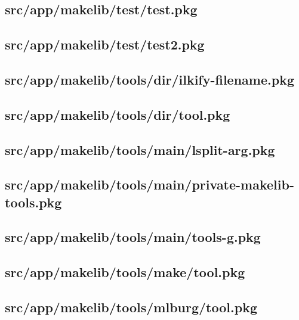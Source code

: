 \subsection{src/app/makelib/test/test.pkg}


\subsection{src/app/makelib/test/test2.pkg}


\subsection{src/app/makelib/tools/dir/ilkify-filename.pkg}


\subsection{src/app/makelib/tools/dir/tool.pkg}


\subsection{src/app/makelib/tools/main/lsplit-arg.pkg}


\subsection{src/app/makelib/tools/main/private-makelib-tools.pkg}


\subsection{src/app/makelib/tools/main/tools-g.pkg}


\subsection{src/app/makelib/tools/make/tool.pkg}


\subsection{src/app/makelib/tools/mlburg/tool.pkg}


